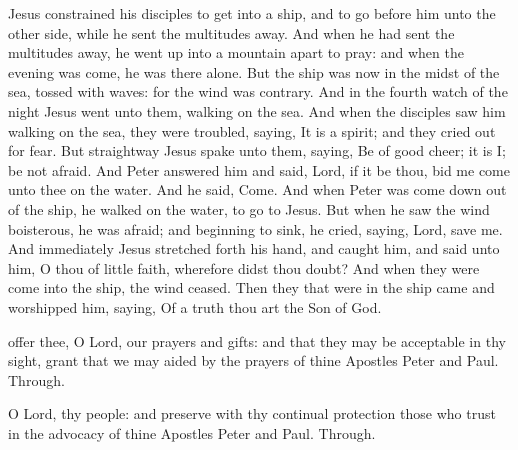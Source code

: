 
 Jesus constrained his disciples to get into a ship, and to go before him unto the other side, while he sent the multitudes away. And when he had sent the multitudes away, he went up into a mountain apart to pray: and when the evening was come, he was there alone. But the ship was now in the midst of the sea, tossed with waves: for the wind was contrary. And in the fourth watch of the night Jesus went unto them, walking on the sea. And when the disciples saw him walking on the sea, they were troubled, saying, It is a spirit; and they cried out for fear. But straightway Jesus spake unto them, saying, Be of good cheer; it is I; be not afraid. And Peter answered him and said, Lord, if it be thou, bid me come unto thee on the water. And he said, Come. And when Peter was come down out of the ship, he walked on the water, to go to Jesus. But when he saw the wind boisterous, he was afraid; and beginning to sink, he cried, saying, Lord, save me. And immediately Jesus stretched forth his hand, and caught him, and said unto him, O thou of little faith, wherefore didst thou doubt? And when they were come into the ship, the wind ceased. Then they that were in the ship came and worshipped him, saying, Of a truth thou art the Son of God.


\secret
{} offer thee, O Lord, our prayers and gifts: and that they may be acceptable in thy sight, grant that we may aided by the prayers of thine Apostles Peter and Paul. Through.


\postcommunion
{} O Lord, thy people: and preserve with thy continual protection those who trust in the advocacy of thine Apostles Peter and Paul. Through.


\clearpage

